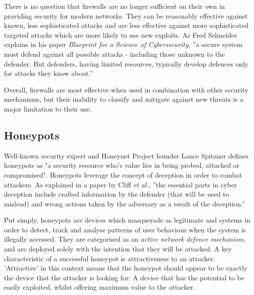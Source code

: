 There is no question that firewalls are no longer sufficient on their own in providing security for modern networks. They can be reasonably effective against known, less sophisticated attacks and are less effective against more sophisticated targeted attacks which are more likely to use new exploits. As Fred Schneider explains in his paper \textit{Blueprint for a Science of Cybersecurity}, ''a secure system must defend against all possible attacks - including those unknown to the defender. But defenders, having limited resources, typically develop defences only for attacks they know about.'' \cite{Schneider11_BlueprintForScienceOfCybersecurity}

Overall, firewalls are most effective when used in combination with other security mechanisms, but their inability to classify and mitigate against new threats is a major limitation to their use. \cite{ThinkingSecurityBellovin}



\subsection{Honeypots} \label{HoneypotsSection}



Well-known security expert and Honeynet Project founder Lance Spitzner defines honeypots as "a security resource who's value lies in being probed, attacked or compromised". Honeypots leverage the concept of deception in order to combat attackers. As explained in a paper by Cliff \textit{et al.}, ''the essential parts in cyber deception include crafted information by the defender (that will be used to mislead) and wrong actions taken by the adversary as a result of the deception.'' \cite{8328971}

Put simply, honeypots are devices which masquerade as legitimate and systems in order to detect, track and analyse patterns of user behaviour when the system is illegally accessed. They are categorised as an \textit{active network defence mechanism}, and are deployed solely with the intention that they will be attacked.  A key characteristic of a successful honeypot is attractiveness to an attacker. 'Attractive' in this context means that the honeypot should appear to be exactly the device that the attacker is looking for: A device that has the potential to be easily exploited, whilst offering maximum value to the attacker. 

